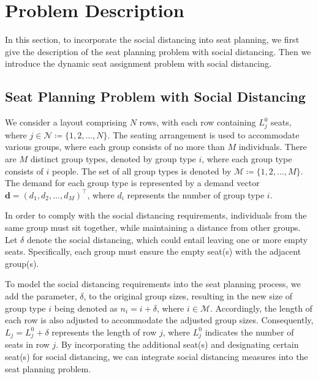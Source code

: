 \section{Problem Description}
In this section, to incorporate the social distancing into seat planning, we first give the description of the seat planning problem with social distancing. Then we introduce the dynamic seat assignment problem with social distancing.


\subsection{Seat Planning Problem with Social Distancing}\label{dynamic_demand}
We consider a layout comprising $N$ rows, with each row containing $L_j^0$ seats, where $j \in \mathcal{N} \coloneqq \{1,2, \ldots, N\}$. The seating arrangement is used to accommodate various groups, where each group consists of no more than $M$ individuals. There are $M$ distinct group types, denoted by group type $i$, where each group type consists of $i$ people. The set of all group types is denoted by $\mathcal{M} \coloneqq \{1, 2, \ldots, M\}$. The demand for each group type is represented by a demand vector $\mathbf{d} = (d_1, d_2, \ldots, d_M)^{\intercal}$, where $d_i$ represents the number of group type $i$.

In order to comply with the social distancing requirements, individuals from the same group must sit together, while maintaining a distance from other groups. Let $\delta$ denote the social distancing, which could entail leaving one or more empty seats. Specifically, each group must ensure the empty seat(s) with the adjacent group(s).


To model the social distancing requirements into the seat planning process, we add the parameter, $\delta$, to the original group sizes, resulting in the new size of group type $i$ being denoted as $n_i = i + \delta$, where $i \in \mathcal{M}$. Accordingly, the length of each row is also adjusted to accommodate the adjusted group sizes. Consequently, $L_j = L_j^{0} + \delta$ represents the length of row $j$, where $L_j^{0}$ indicates the number of seats in row $j$. By incorporating the additional seat(s) and designating certain seat(s) for social distancing, we can integrate social distancing measures into the seat planning problem.



